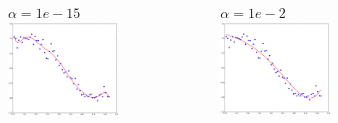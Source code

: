 \documentclass[handout, 10pt]{beamer}
\begin{document}
\begin{frame}
\begin{columns}
\begin{figure}
\end{figure}
\vspace{-2em}
\begin{figure}
$\alpha=1e-15$
\includegraphics[width=0.99\textwidth]{./ridge_alpha1e-15.png}
\end{figure}
\vspace{-2em}
\begin{figure}
$\alpha=1e-2$
\includegraphics[width=0.99\textwidth]{./ridge_alpha1e-2.png}
\end{figure}

\end{columns}
\end{frame}
\end{document}

